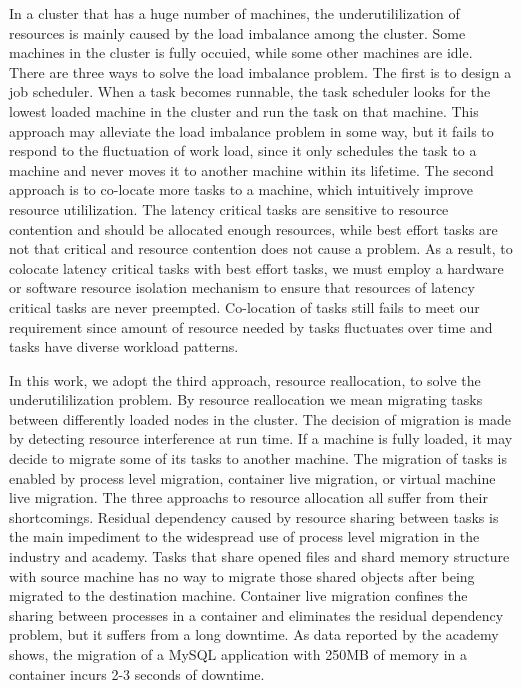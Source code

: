 \begin{bigabstract}
In a cluster that has a huge number of machines, the underutililization of resources is mainly caused by the load imbalance among the cluster. Some machines in the cluster is fully occuied, while some other machines are idle. There are three ways to solve the load imbalance problem. The first is to design a job scheduler. When a task becomes runnable, the task scheduler looks for the lowest loaded machine in the cluster and run the task on that machine. This approach may alleviate the load imbalance problem in some way, but it fails to respond to the fluctuation of work load, since it only schedules the task to a machine and never moves it to another machine within its lifetime. The second approach is to co-locate more tasks to a machine, which intuitively improve resource utililization. The latency critical tasks are sensitive to resource contention and should be allocated enough resources, while best effort tasks are not that critical and resource contention does not cause a problem. As a result, to colocate latency critical tasks with best effort tasks, we must employ a hardware or software resource isolation mechanism to ensure that resources of latency critical tasks are never preempted. Co-location of tasks still fails to meet our requirement since amount of resource needed by tasks fluctuates over time and tasks have diverse workload patterns. 

In this work, we adopt the third approach, resource reallocation, to solve the underutililization problem. By resource reallocation we mean migrating tasks between differently loaded nodes in the cluster. The decision of migration is made by detecting resource interference at run time. If a machine is fully loaded, it may decide to migrate some of its tasks to another machine. The migration of tasks is enabled by process level migration, container live migration, or virtual machine live migration. The three approachs to resource allocation all suffer from their shortcomings. Residual dependency caused by resource sharing between tasks is the main impediment to the widespread use of process level migration in the industry and academy. Tasks that share opened files and shard memory structure with source machine has no way to migrate those shared objects after being migrated to the destination machine. Container live migration confines the sharing between processes in a container and eliminates the residual dependency problem, but it suffers from a long downtime. As data reported by the academy shows, the migration of a MySQL application with 250MB of memory in a container incurs 2-3 seconds of downtime.


\end{bigabstract}
